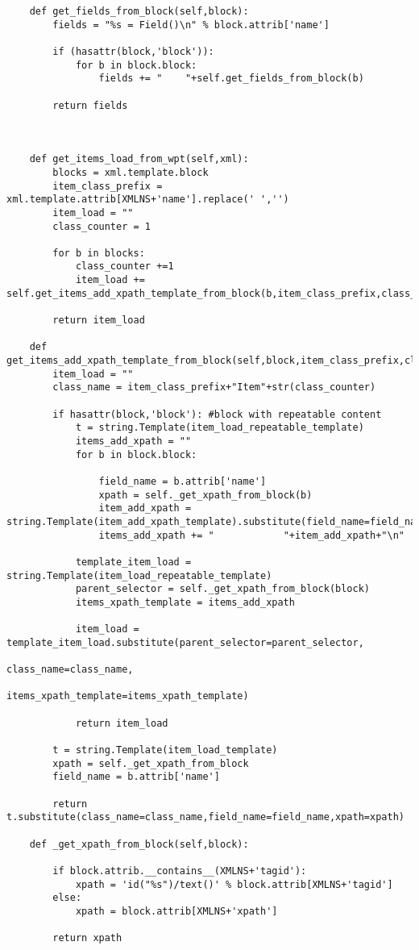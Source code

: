 \begin{lstlisting}
    def get_fields_from_block(self,block):
        fields = "%s = Field()\n" % block.attrib['name']

        if (hasattr(block,'block')):
            for b in block.block:
                fields += "    "+self.get_fields_from_block(b)
        
        return fields



    def get_items_load_from_wpt(self,xml):
        blocks = xml.template.block
        item_class_prefix = xml.template.attrib[XMLNS+'name'].replace(' ','')
        item_load = ""
        class_counter = 1

        for b in blocks:
            class_counter +=1
            item_load += self.get_items_add_xpath_template_from_block(b,item_class_prefix,class_counter)+"\n"

        return item_load

    def get_items_add_xpath_template_from_block(self,block,item_class_prefix,class_counter):
        item_load = ""
        class_name = item_class_prefix+"Item"+str(class_counter)

        if hasattr(block,'block'): #block with repeatable content
            t = string.Template(item_load_repeatable_template)
            items_add_xpath = ""
            for b in block.block:

                field_name = b.attrib['name']
                xpath = self._get_xpath_from_block(b)
                item_add_xpath = string.Template(item_add_xpath_template).substitute(field_name=field_name,xpath=xpath)
                items_add_xpath += "            "+item_add_xpath+"\n"

            template_item_load = string.Template(item_load_repeatable_template)
            parent_selector = self._get_xpath_from_block(block)
            items_xpath_template = items_add_xpath
             
            item_load = template_item_load.substitute(parent_selector=parent_selector,
                                                      class_name=class_name,
                                                      items_xpath_template=items_xpath_template)

            return item_load

        t = string.Template(item_load_template)
        xpath = self._get_xpath_from_block
        field_name = b.attrib['name']

        return t.substitute(class_name=class_name,field_name=field_name,xpath=xpath)

    def _get_xpath_from_block(self,block):

        if block.attrib.__contains__(XMLNS+'tagid'):
            xpath = 'id("%s")/text()' % block.attrib[XMLNS+'tagid']
        else:
            xpath = block.attrib[XMLNS+'xpath']

        return xpath
\end{lstlisting}

